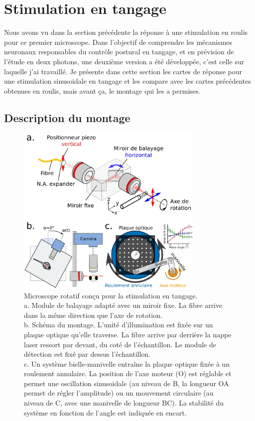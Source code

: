\section{Stimulation en tangage}\label{SECTIONtiltmicroscope1P}

Nous avons vu dans la section précédente la réponse à une stimulation en roulis pour ce premier microscope. Dans l'objectif de comprendre les mécanismes neuronaux responsables du contrôle postural en tangage, et en prévision de l'étude en deux photons, une deuxième version a été développée, c'est celle sur laquelle j'ai travaillé. Je présente dans cette section les cartes de réponse pour une stimulation sinusoidale en tangage et les compare avec les cartes précédentes obtenues en roulis, mais avant ça, le montage qui les a permises.

\subsection{Description du montage}

\begin{figure}
\centering
\includegraphics[width=0.8\textwidth]{./files/miniature_light-sheet_tilt.svg.png}
\caption{Microscope rotatif conçu pour la stimulation en tangage.
\\a. Module de balayage adapté avec un miroir fixe. La fibre arrive dans la même direction que l'axe de rotation.
\\b. Schéma du montage. L'unité d'illumination est fixée sur un plaque optique qu'elle traverse. La fibre arrive par derrière la nappe laser ressort par devant, du coté de l'échantillon. Le module de détection est fixé par dessus l'échantillon.
\\c. Un système bielle-manivelle entraîne la plaque optique fixée à un roulement annulaire. La position de l'axe moteur (O) est réglable et permet une oscillation sinusoidale (au niveau de B, la longueur OA permet de régler l'amplitude) ou un mouvement circulaire (au niveau de C, avec une manivelle de longueur BC). La stabilité du système en fonction de l'angle est indiquée en encart.
\label{FIGtiltlightsheet}}
\end{figure}

